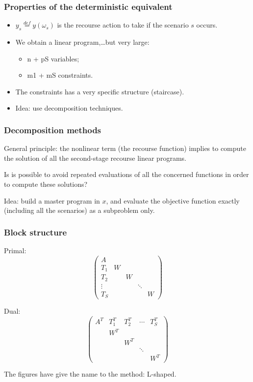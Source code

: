 \documentclass{beamer}
\begin{document}
\begin{frame}
\frametitle{Properties of the deterministic equivalent}

\begin{itemize}
\item
$y_s \overset{def}{=} y(\omega_s)$ is the recourse action to take if the scenario $s$ occurs.
\item
We obtain a linear program,\ldots but very large:
\begin{itemize}
\item
n + pS variables;
\item
m1 + mS constraints.
\end{itemize}
\item
The constraints has a very specific structure (staircase).
\item
{\red Idea}: use decomposition techniques.
\end{itemize}

\end{frame}

\begin{frame}
\frametitle{Decomposition methods}

{\red General principle}: the nonlinear term (the recourse function) implies to compute the solution of all the second-stage recourse linear programs.

\mbox{}

Is is possible to avoid repeated evaluations of all the concerned functions in order to compute these solutions?

\mbox{}

{\red Idea}: build a master program in $x$, and evaluate the objective function exactly (including all the scenarios) as a subproblem only.

\end{frame}

\begin{frame}
\frametitle{Block structure}

\begin{minipage}{0.49\textwidth}
Primal:
$$
\begin{pmatrix}
A \\
T_1 & W \\
T_2 & & W \\
\vdots & & & \ddots \\
T_S & & & & W
\end{pmatrix}
$$
\end{minipage}
\begin{minipage}{0.49\textwidth}
Dual:
	$$
	\begin{pmatrix}
	A^T & T_1^T & T_2^T & \cdots & T_S^T \\
	& W^T \\
	& & W^T \\
	& & & \ddots \\
	& & & & W^T
	\end{pmatrix}
	$$
\end{minipage}

\mbox{}

The figures have give the name to the method: L-shaped.
\end{frame}
\end{document}

